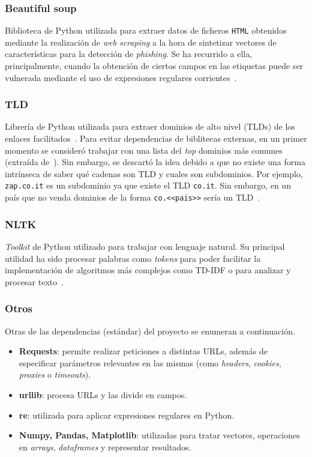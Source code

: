\subsubsection{Beautiful soup}

Biblioteca de Python utilizada para extraer datos de ficheros \texttt{HTML} obtenidos mediante la realización de \textit{web scraping} a la hora de sintetizar vectores de características para la detección de \textit{phishing}. Se ha recurrido a ella, principalmente, cuando la obtención de ciertos campos en las etiquetas puede ser vulnerada mediante el uso de expresiones regulares corrientes~\cite{bs4Docs}.

\subsubsection{TLD}

Librería de Python utilizada para extraer dominios de alto nivel (TLDs) de los enlaces facilitados~\cite{tldLibreria}. Para evitar dependencias de biblitecas externas, en un primer momento se consideró trabajar con una lista del \textit{top} dominios más comunes (extraída de~\cite{tldLista}). Sin embargo, se descartó la idea debido a que no existe una forma intrínseca de saber qué cadenas son TLD y cuales son subdominios. Por ejemplo, \texttt{zap.co.it} es un subdominio ya que existe el TLD \texttt{co.it}. Sin embargo, en un país que no venda dominios de la forma \texttt{co.<<pais>>} sería un TLD~\cite{tldNogenerico}.

\subsubsection{NLTK}

\textit{Toolkit} de Python utilizado para trabajar con lenguaje natural. Su principal utilidad ha sido procesar palabras como \textit{tokens} para poder facilitar la implementación de algoritmos más complejos como TD-IDF o para analizar y procesar texto~\cite{nltk}.

\subsubsection{Otros}

Otras de las dependencias (estándar) del proyecto se enumeran a continuación.

\begin{itemize}
	\item \textbf{Requests}: permite realizar peticiones a distintas URLs, además de especificar parámetros relevantes en las mismas (como \textit{headers}, \textit{cookies}, \textit{proxies} o \textit{timeouts}).
	\item \textbf{urllib}: procesa URLs y las divide en campos.
	\item \textbf{re}: utilizada para aplicar expresiones regulares en Python.
	\item \textbf{Numpy, Pandas, Matplotlib}: utilizadas para tratar vectores, operaciones en \textit{arrays}, \textit{dataframes} y representar resultados.
\end{itemize}



